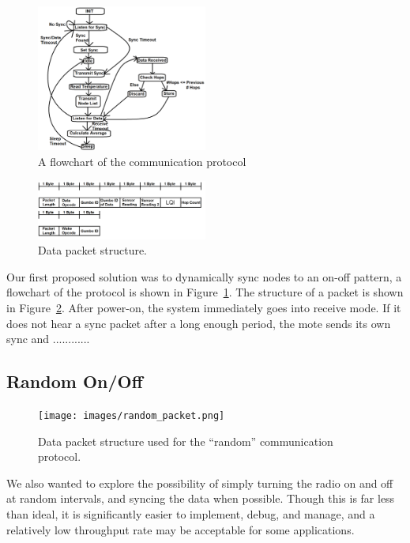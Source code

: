 \begin{figure}[h!]
  \centering
  \includegraphics[width=0.5\textwidth]{images/algorithm_flowchart.png}
  \caption{A flowchart of the communication protocol
  \label{img:flowchart}
  }
\end{figure}

\begin{figure}[h!]
  \centering
  \includegraphics[width=0.5\textwidth]{images/data_packet.png}
  \caption{Data packet structure.
  \label{img:hb_packet}
  }
\end{figure}

Our first proposed solution was to dynamically sync nodes to an on-off pattern, a flowchart of the protocol is shown
in Figure~\ref{img:flowchart}.  The structure of a packet is shown in Figure~\ref{img:hb_packet}.  After power-on, the
system immediately goes into receive mode. If it does not hear a sync packet after a long enough period, the mote sends
its own sync and ............

\subsection{Random On/Off}
\label{section:random_dc}

\begin{figure}[h!]
  \centering
  \texttt{[image: images/random\_packet.png]}
  \caption{Data packet structure used for the ``random'' communication protocol.
  \label{img:rand_packet}
  }
\end{figure}

We also wanted to explore the possibility of simply turning the radio on and off at random intervals, and syncing the
data when possible.  Though this is far less than ideal, it is significantly easier to implement, debug, and manage, and
a relatively low throughput rate may be acceptable for some applications.

